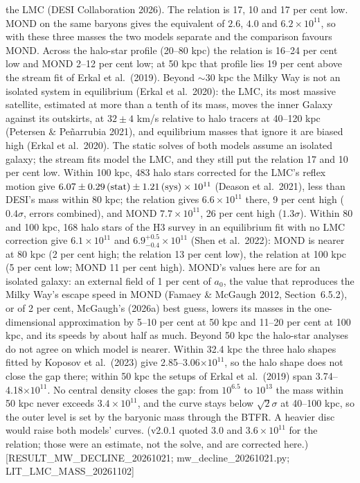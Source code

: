 \documentclass[
  10pt,
]{article}
\begin{document}
the LMC (DESI Collaboration 2026). The relation is 17, 10 and 17 per cent low. MOND on the same baryons gives the equivalent of $2.6$, $4.0$ and $6.2\times10^{11}$, so with these three masses the two models separate and the comparison favours MOND. Across the halo-star profile (20--80 kpc) the relation is 16--24 per cent low and MOND 2--12 per cent low; at 50 kpc that profile lies 19 per cent above the stream fit of Erkal et al.~(2019). Beyond $\sim$30 kpc the Milky Way is not an isolated system in equilibrium (Erkal et al.~2020): the LMC, its most massive satellite, estimated at more than a tenth of its mass, moves the inner Galaxy against its outskirts, at $32\pm4$ km/s relative to halo tracers at 40--120 kpc (Petersen \& Pe\~narrubia 2021), and equilibrium masses that ignore it are biased high (Erkal et al.~2020). The static solves of both models assume an isolated galaxy; the stream fits model the LMC, and they still put the relation 17 and 10 per cent low. Within 100 kpc, 483 halo stars corrected for the LMC's reflex motion give $6.07\pm0.29\,({\rm stat})\pm1.21\,({\rm sys})\times10^{11}$ (Deason et al.~2021), less than DESI's mass within 80 kpc; the relation gives $6.6\times10^{11}$ there, 9 per cent high ($0.4\sigma$, errors combined), and MOND $7.7\times10^{11}$, 26 per cent high ($1.3\sigma$). Within 80 and 100 kpc, 168 halo stars of the H3 survey in an equilibrium fit with no LMC correction give $6.1\times10^{11}$ and $6.9^{+0.5}_{-0.4}\times10^{11}$ (Shen et al.~2022): MOND is nearer at 80 kpc (2 per cent high; the relation 13 per cent low), the relation at 100 kpc (5 per cent low; MOND 11 per cent high). MOND's values here are for an isolated galaxy: an external field of 1 per cent of $a_0$, the value that reproduces the Milky Way's escape speed in MOND (Famaey \& McGaugh 2012, Section~6.5.2), or of 2 per cent, McGaugh's (2026a) best guess, lowers its masses in the one-dimensional approximation by 5--10 per cent at 50 kpc and 11--20 per cent at 100 kpc, and its speeds by about half as much. Beyond 50 kpc the halo-star analyses do not agree on which model is nearer. Within 32.4 kpc the three halo shapes fitted by Koposov et al.~(2023) give 2.85--3.06$\times10^{11}$, so the halo shape does not close the gap there; within 50 kpc the setups of Erkal et al.~(2019) span 3.74--4.18$\times10^{11}$. No central density closes the gap: from $10^{6.5}$ to $10^{13}$ the mass within 50 kpc never exceeds $3.4\times10^{11}$, and the curve stays below $\sqrt{2}\sigma$ at 40--100 kpc, so the outer level is set by the baryonic mass through the BTFR. A heavier disc would raise both models' curves. (v2.0.1 quoted $3.0$ and $3.6\times10^{11}$ for the relation; those were an estimate, not the solve, and are corrected here.) {[}RESULT\_MW\_DECLINE\_20261021; mw\_decline\_20261021.py; LIT\_LMC\_MASS\_20261102{]}
\end{document}

